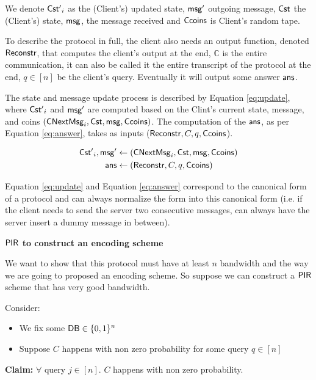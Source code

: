 {%

We denote ${\sf Cst'}_{i}$ as the (Client's) updated state, ${\sf msg'}$ outgoing message, ${\sf Cst}$ the (Client's) state, ${\sf msg}$, the message received and ${\sf Ccoins}$ is Client's random tape. 

To describe the protocol in full, the client also needs an output function, denoted ${\sf Reconstr}$, that computes the client's output at the end, $\mathbb{C}$ is the entire communication, it can also be called it the entire transcript of the protocol at the end, $q \in [n]$ be the client's query. Eventually it will output some answer ${\sf ans}$.

The state and message update process is described by Equation \ref{eq:update}, where ${\sf Cst'}_{i}$ and ${\sf msg'}$ are computed based on the Clint's current state, message, and coins $({\sf C Next Msg}_{i}, {\sf Cst}, {\sf msg}, {\sf Ccoins})$. The computation of the ${\sf ans}$, as per Equation \ref{eq:answer}, takes as inputs (${\sf Reconstr}, C, q, {\sf Ccoins}$).

\begin{align}
{\sf Cst'}_{i}, {\sf msg'} & \xleftarrow{} ({\sf C Next Msg}_{i}, {\sf Cst}, {\sf msg}, {\sf Ccoins}) \label{eq:update} \\
{\sf ans} & \leftarrow ({\sf Reconstr}, C, q, {\sf Ccoins}) \label{eq:answer}
\end{align}

Equation \ref{eq:update} and Equation \ref{eq:answer} correspond to the canonical form of a protocol and can always normalize the form into this canonical form (i.e. if the client needs to send the server two consecutive messages, can always have the server insert a dummy message in between). 


\textbf{${\sf PIR}$ to construct an encoding scheme}

We want to show that this protocol must have at least $n$ bandwidth and the way we are going to proposed an encoding scheme. So suppose we can construct a ${\sf PIR}$ scheme that has very good bandwidth. 

Consider:

\begin{itemize}
    \item We fix some ${\sf DB} \in \{0,1\}^n$
    \item Suppose $C$ happens with non zero probability for some query $q \in [n]$
\end{itemize}

\textbf{Claim:} $\forall$ query $j \in [n]$. $C$ happens with non zero probability.


}
